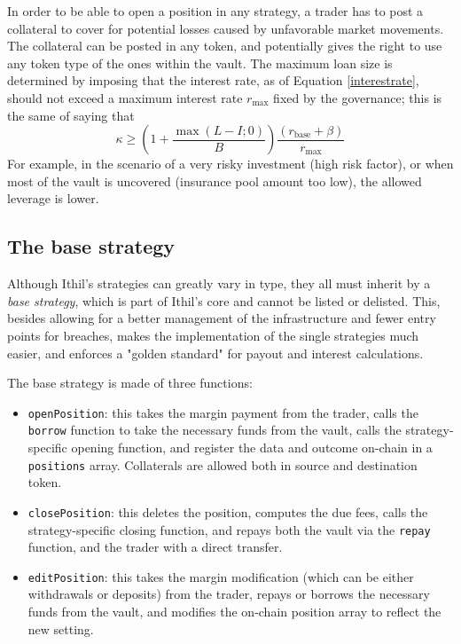 \documentclass[a4paper,10 pt]{article}
\theoremstyle{definition}
\begin{document}
In order to be able to open a position in any strategy, a trader has to post a collateral to cover for potential losses caused by unfavorable market movements. The collateral can be posted in any token, and potentially gives the right to use any token type of the ones within the vault. The maximum loan size is determined by imposing that the interest rate, as of Equation \eqref{interestrate}, should not exceed a maximum interest rate $r_{\text{max}}$ fixed by the governance; this is the same of saying that 
$$\kappa \ge  \left(1+\frac{\max{(L-I;0)}}{B}\right)\frac{(r_{\text{base}} + \beta)}{r_{\text{max}}}$$
 For example, in the scenario of a very risky investment (high risk factor), or when most of the vault is uncovered (insurance pool amount too low), the allowed leverage is lower.

\subsection{The base strategy}

Although Ithil's strategies can greatly vary in type, they all must inherit by a {\it base strategy}, which is part of Ithil's core and cannot be listed or delisted. This, besides allowing for a better management of the infrastructure and fewer entry points for breaches, makes the implementation of the single strategies much easier, and enforces a "golden standard" for payout and interest calculations.

The base strategy is made of three functions:
\begin{itemize}
\item \verb|openPosition|: this takes the margin payment from the trader, calls the \verb|borrow| function to take the necessary funds from the vault, calls the strategy-specific opening function, and register the data and outcome on-chain in a \verb|positions| array. Collaterals are allowed both in source and destination token.
\item \verb|closePosition|: this deletes the position, computes the due fees, calls the strategy-specific closing function, and repays both the vault via the \verb|repay| function, and the trader with a direct transfer.
\item \verb|editPosition|: this takes the margin modification (which can be either withdrawals or deposits) from the trader, repays or borrows the necessary funds from the vault, and modifies the on-chain position array to reflect the new setting.
\end{itemize}
\end{document}
